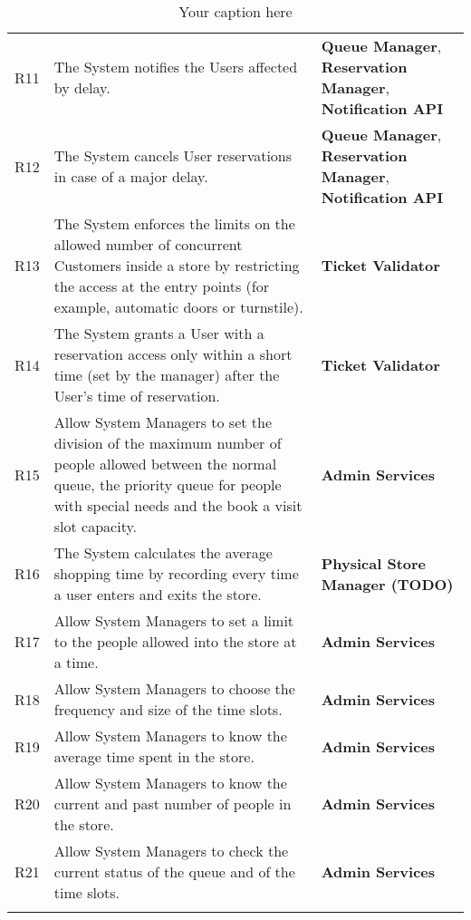 \begin{longtable}{p{} p{} p{}}
    R11 & The System notifies the Users affected by delay. & \textbf{Queue Manager}, \textbf{Reservation Manager}, \textbf{Notification API}\\
    R12 & The System cancels User reservations in case of a major delay. & \textbf{Queue Manager}, \textbf{Reservation Manager}, \textbf{Notification API}\\
    R13 & The System enforces the limits on the allowed number of concurrent Customers inside a store by restricting the access at the entry points (for example, automatic doors or turnstile). & \textbf{Ticket Validator}\\
    R14 & The System grants a User with a reservation access only within a short time (set by the manager) after the User's time of reservation. & \textbf{Ticket Validator}\\
    R15 & Allow System Managers to set the division of the maximum number of people allowed between the normal queue, the priority queue for people with special needs and the book a visit slot capacity. & \textbf{Admin Services}\\
    R16 & The System calculates the average shopping time by recording every time a user enters and exits the store. & \textbf{Physical Store Manager (TODO)}\\
    
    R17 & Allow System Managers to set a limit to the people allowed into the store at a time. & \textbf{Admin Services}\\
    R18 & Allow System Managers to choose the frequency and size of the time slots. & \textbf{Admin Services}\\
    R19 & Allow System Managers to know the average time spent in the store. &  \textbf{Admin Services}\\
    R20 & Allow System Managers to know the current and past number of people in the store. & \textbf{Admin Services}\\
    R21 & Allow System Managers to check the current status of the queue and of the time slots. & \textbf{Admin Services}\\

    \caption{Your caption here} %
    \label{tab:myfirstlongtable}
\end{longtable}
    
